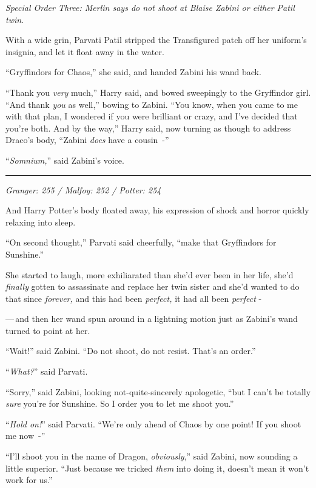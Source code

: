 \emph{Special Order Three: Merlin says do not shoot at Blaise Zabini or either Patil twin.}

With a wide grin, Parvati Patil stripped the Transfigured patch off her uniform's insignia, and let it float away in the water.

``Gryffindors for Chaos,'' she said, and handed Zabini his wand back.

``Thank you \emph{very} much,'' Harry said, and bowed sweepingly to the Gryffindor girl. ``And thank \emph{you} as well,'' bowing to Zabini. ``You know, when you came to me with that plan, I wondered if you were brilliant or crazy, and I've decided that you're both. And by the way,'' Harry said, now turning as though to address Draco's body, ``Zabini \emph{does} have a cousin~-''

``\emph{Somnium,}'' said Zabini's voice.

\begin{center}\rule{3in}{0.4pt}\end{center}

\emph{Granger: 255 / Malfoy: 252 / Potter: 254}

And Harry Potter's body floated away, his expression of shock and horror quickly relaxing into sleep.

``On second thought,'' Parvati said cheerfully, ``make that Gryffindors for Sunshine.''

She started to laugh, more exhiliarated than she'd ever been in her life, she'd \emph{finally} gotten to assassinate and replace her twin sister and she'd wanted to do that since \emph{forever,} and this had been \emph{perfect,} it had all been \emph{perfect} -

---\,and then her wand spun around in a lightning motion just as Zabini's wand turned to point at her.

``Wait!'' said Zabini. ``Do not shoot, do not resist. That's an order.''

``\emph{What?}'' said Parvati.

``Sorry,'' said Zabini, looking not-quite-sincerely apologetic, ``but I can't be totally \emph{sure} you're for Sunshine. So I order you to let me shoot you.''

``\emph{Hold on!}'' said Parvati. ``We're only ahead of Chaos by one point! If you shoot me now~-''

``I'll shoot you in the name of Dragon, \emph{obviously},'' said Zabini, now sounding a little superior. ``Just because we tricked \emph{them} into doing it, doesn't mean it won't work for us.''

